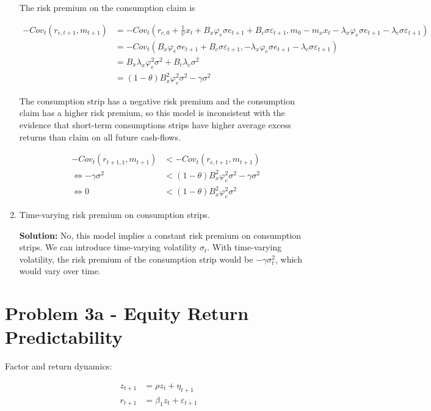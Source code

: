 \documentclass{article}
\begin{document}
\begin{enumerate}
The risk premium on the consumption claim is

\begin{align*}
-Cov_t(r_{c,t+1}, m_{t+1}) 
&= -Cov_t(r_{c,0} +  \frac{1}{\psi} x_t  + B_x \varphi_e\sigma e_{t+1} + B_c \sigma \varepsilon_{t+1}, m_0 - m_x x_t -\lambda_x \varphi_e \sigma e_{t+1} - \lambda_c \sigma \varepsilon_{t+1})\\
&= -Cov_t( B_x \varphi_e\sigma e_{t+1} + B_c \sigma \varepsilon_{t+1}, -\lambda_x \varphi_e \sigma e_{t+1} - \lambda_c \sigma \varepsilon_{t+1})\\
&= B_x\lambda_x \varphi_e^2 \sigma^2 + B_c \lambda_c \sigma^2\\
&= (1-\theta)B_x^2 \varphi_e^2\sigma^2 -\gamma \sigma^2
\end{align*}

The consumption strip has a negative risk premium and the consumption claim has a higher risk premium, so this model is inconsistent with the evidence that short-term consumptions strips have higher average excess returns than claim on all future cash-flows.

\begin{align*}
-Cov_t(r_{t+1, 1}, m_{t+1}) &< -Cov_t(r_{c,t+1}, m_{t+1}) \\
\iff
-\gamma \sigma^2 &< (1-\theta)B_x^2 \varphi_e^2\sigma^2 -\gamma \sigma^2\\
\iff
0 &< (1-\theta)B_x^2 \varphi_e^2\sigma^2
\end{align*}

\item Time-varying risk premium on consumption strips.

\bigskip

\textbf{Solution:} No, this model implies a constant risk premium on consumption strips.  We can introduce time-varying volatility $\sigma_t$. With time-varying volatility, the risk premium of the consumption strip would be $-\gamma \sigma_t^2$, which would vary over time.

\end{enumerate}

\pagebreak

\section{Problem 3a - Equity Return Predictability}

Factor and return dynamics:

\begin{align*}
z_{t+1} &= \rho z_{t} + \eta_{t+1}\\
r_{t+1} &= \beta_1 z_t + \varepsilon_{t+1}
\end{align*}
\end{document}

